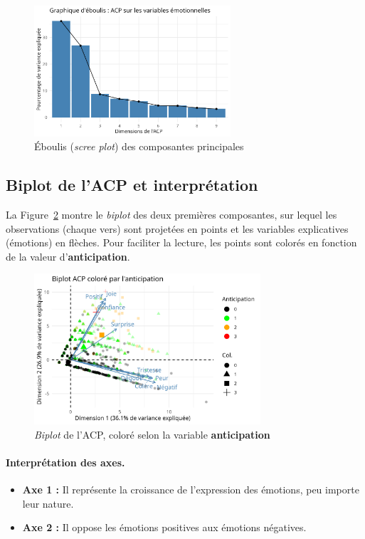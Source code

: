 \documentclass[12pt,a4paper]{article}
\begin{document}
\begin{figure}[H]
	\centering
	\includegraphics[width=0.65\textwidth]{figures_PCA/pca_screeplot.png}
	\caption{Éboulis (\textit{scree plot}) des composantes principales}
	\label{fig:pca_scree}
\end{figure}

\subsection{Biplot de l’ACP et interprétation}
La Figure~\ref{fig:pca_biplot} montre le \textit{biplot} des deux premières composantes, 
sur lequel les observations (chaque vers) sont projetées en points et 
les variables explicatives (émotions) en flèches. Pour faciliter la lecture, 
les points sont colorés en fonction de la valeur d’\textbf{anticipation}.

\begin{figure}[H]
	\centering
	\includegraphics[width=0.75\textwidth]{figures_PCA/pca_biplot_anticipation.png}
	\caption{\textit{Biplot} de l’ACP, coloré selon la variable \textbf{anticipation}}
	\label{fig:pca_biplot}
\end{figure}

\paragraph{Interprétation des axes.}
\begin{itemize}
	\item \textbf{Axe 1 :} Il représente la croissance de l’expression des émotions, peu importe leur nature.
	\item \textbf{Axe 2 :} Il oppose les émotions positives aux émotions négatives.
\end{itemize}
\end{document}
